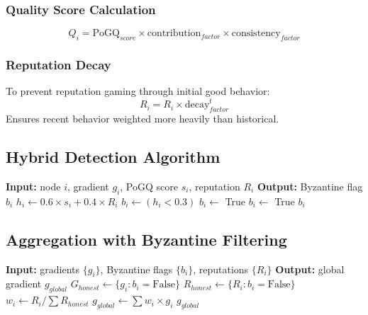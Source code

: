 \documentclass[conference]{IEEEtran}
\begin{document}
\subsubsection{Quality Score Calculation}
\begin{equation}
Q_i = \text{PoGQ}_{score} \times \text{contribution}_{factor} \times \text{consistency}_{factor}
\end{equation}

\subsubsection{Reputation Decay}
To prevent reputation gaming through initial good behavior:
\begin{equation}
R_i = R_i \times \text{decay}_{factor}^t
\end{equation}
Ensures recent behavior weighted more heavily than historical.

\subsection{Hybrid Detection Algorithm}

\begin{algorithm}
\caption{Byzantine Detection Algorithm}
\begin{algorithmic}
\STATE \textbf{Input:} node $i$, gradient $g_i$, PoGQ score $s_i$, reputation $R_i$
\STATE \textbf{Output:} Byzantine flag $b_i$
\STATE
\STATE $h_i \leftarrow 0.6 \times s_i + 0.4 \times R_i$ 
\STATE $b_i \leftarrow (h_i < 0.3)$ 
\STATE
{}
    \STATE $b_i \leftarrow$ True
\ENDIF
{}
    \STATE $b_i \leftarrow$ True
\ENDIF
\RETURN $b_i$
\end{algorithmic}
\end{algorithm}

\subsection{Aggregation with Byzantine Filtering}

\begin{algorithm}
\caption{Secure Aggregation}
\begin{algorithmic}
\STATE \textbf{Input:} gradients $\{g_i\}$, Byzantine flags $\{b_i\}$, reputations $\{R_i\}$
\STATE \textbf{Output:} global gradient $g_{global}$
\STATE
\STATE $G_{honest} \leftarrow \{g_i : b_i = \text{False}\}$
\STATE $R_{honest} \leftarrow \{R_i : b_i = \text{False}\}$
\STATE $w_i \leftarrow R_i / \sum R_{honest}$ 
\STATE $g_{global} \leftarrow \sum w_i \times g_i$
\RETURN $g_{global}$
\end{algorithmic}
\end{algorithm}
\end{document}
